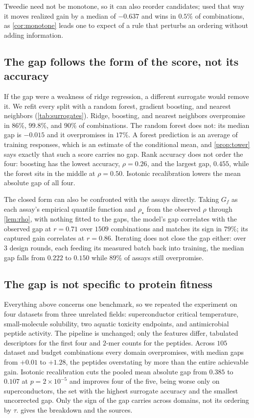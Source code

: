 \documentclass{article}
\theoremstyle{plain}
\theoremstyle{definition}
\begin{document}
Tweedie need not be monotone, so it can also reorder candidates; used that way it
moves realized gain by a median of $-0.637$ and wins in $0.5\%$ of combinations, as
\cref{cor:monotone} leads one to expect of a rule that perturbs an ordering without
adding information.

\subsection{The gap follows the form of the score, not its accuracy}
\label{sec:results-form}

If the gap were a weakness of ridge regression, a different surrogate would remove it.
We refit every split with a random forest, gradient boosting, and nearest neighbors
(\cref{tab:surrogates}). Ridge, boosting, and nearest neighbors overpromise in $86\%$,
$99.8\%$, and $90\%$ of combinations. The random forest does not: its median gap is
$-0.015$ and it overpromises in $17\%$. A forest prediction is an average of training
responses, which is an estimate of the conditional mean, and \cref{prop:tower} says
exactly that such a score carries no gap. Rank accuracy does not order the four:
boosting has the lowest accuracy, $\rho = 0.26$, and the largest gap, $0.455$, while
the forest sits in the middle at $\rho = 0.50$. Isotonic recalibration lowers the mean
absolute gap of all four.

The closed form can also be confronted with the assays directly. Taking $G_{\!f}$ as
each assay's empirical quantile function and $\rho_\star$ from the observed $\rho$
through \cref{lem:rho}, with nothing fitted to the gaps, the model's gap correlates
with the observed gap at $r = 0.71$ over $1509$ combinations and matches its sign in
$79\%$; its captured gain correlates at $r = 0.86$. Iterating does not close the gap
either: over $3$ design rounds, each feeding its measured batch back into training, the
median gap falls from $0.222$ to $0.150$ while $89\%$ of assays still overpromise.

\subsection{The gap is not specific to protein fitness}
\label{sec:results-domains}

Everything above concerns one benchmark, so we repeated the experiment on four datasets
from three unrelated fields: superconductor critical temperature, small-molecule
solubility, two aquatic toxicity endpoints, and antimicrobial peptide activity. The
pipeline is unchanged; only the features differ, tabulated descriptors for the first
four and $2$-mer counts for the peptides. Across
$105$ dataset and budget combinations every domain overpromises, with median gaps from
$+0.01$ to $+1.28$, the peptides overstating by more than the entire achievable gain.
Isotonic recalibration cuts the pooled mean absolute gap from $0.385$ to $0.107$ at
$p = 2 \times 10^{-5}$ and improves four of the five, being worse only on
superconductors, the set with the highest surrogate accuracy and the smallest
uncorrected gap. Only the sign of the gap carries across domains, not its ordering by
$\tau$.  gives the breakdown and the sources.
\end{document}
